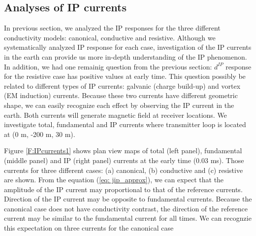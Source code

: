 \documentclass[a4paper, 11pt]{article}
\newcommand{\dip}{d^{IP}}
\begin{document}
\subsection{Analyses of IP currents}
In previous section, we analyzed the IP responses for the three different conductivity models: canonical, conductive and resistive. Although we systematically analyzed IP response for each case, investigation of the IP currents in the earth can provide us more in-depth understanding of the IP phenomenon. In addition, we had one remainig question from the previous section: $\dip$ response for the resistive case has positive values at early time. This question possibly be related to different types of IP currents: galvanic (charge build-up) and vortex (EM induction) currents. Because these two currents have different geometric shape, we can easily recognize each effect by observing the IP current in the earth. Both currents will generate magnetic field at receiver locations. We investigate total, fundamental and IP currents where transmitter loop is located at (0 m, -200 m, 30 m). 

Figure \ref{F:IPcurrents1} shows plan view maps of total (left panel), fundamental (middle panel) and IP (right panel) currents at the early time (0.03 ms).  Those currents for three different cases: (a) canonical, (b) conductive and (c) resistive are shown. From the equation (\ref{eq: jip_approx}), we can expect that the amplitude of the IP current may proportional to that of the reference currents. Direction of the IP current may be opposite to fundamental currents. Because the canonical case does not have conductivity contrast, the direction of the reference current may be similar to the fundamental current for all times. We can recognzie this expectation on three currents for the canonical case
\end{document}
